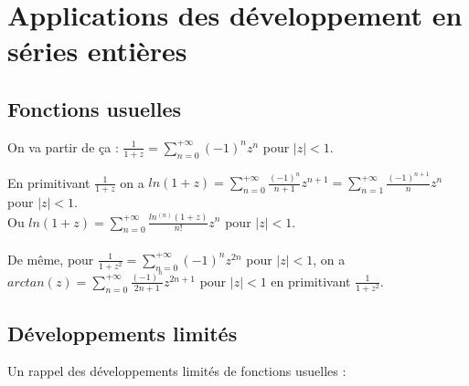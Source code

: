 \documentclass{article}
\begin{document}
\section{Applications des développement en séries entières}
\subsection{Fonctions usuelles}

On va partir de ça :
$\frac{1}{1+z} = \sum_{n=0}^{+\infty} (-1)^n z^n$ pour $|z| < 1$.

En primitivant $\frac{1}{1+z}$ on a $ln(1 + z) = \sum_{n=0}^{+\infty} \frac{(-1)^{n}}{n+1} z^{n+1} = \sum_{n=1}^{+\infty} \frac{(-1)^{n+1}}{n} z^n$ pour $|z| < 1$.\\
Ou $ln(1+z) = \sum_{n=0}^{+\infty} \frac{ln^{(n)}(1+z)}{n!} z^n$ pour $|z| < 1$.\\\\

De même, pour $\frac{1}{1+z^2} = \sum_{n=0}^{+\infty} (-1)^n z^{2n}$ pour $|z| < 1$, on a $arctan(z) = \sum_{n=0}^{+\infty} \frac{(-1)^n}{2n+1} z^{2n+1}$ pour $|z| < 1$ en primitivant $\frac{1}{1+z^2}$.

\subsection{Développements limités}

\newpage
Un rappel des développements limités de fonctions usuelles :
\renewcommand{\arraystretch}{1.8} %
\end{document}
